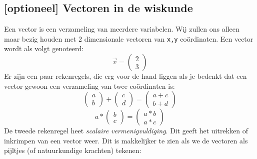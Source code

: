 \subsection{[optioneel] Vectoren in de wiskunde}
Een vector is een verzameling van meerdere variabelen. Wij zullen ons alleen maar bezig houden met 2 dimensionale vectoren van \texttt{x,y} co\"ordinaten.
Een vector wordt als volgt genoteerd: 
$$
\vec{v}=
\begin{pmatrix}
2\\ 
3
\end{pmatrix}
$$
Er zijn een paar rekenregels, die erg voor de hand liggen als je bedenkt dat een vector gewoon een verzameling van twee co\"ordinaten is:
$$
\begin{pmatrix}
a\\ 
b
\end{pmatrix}
+
\begin{pmatrix}
c\\ 
d
\end{pmatrix}
=
\begin{pmatrix}
a + c\\ 
b + d
\end{pmatrix}
$$
$$
a * 
\begin{pmatrix}
b\\ 
c
\end{pmatrix}
=
\begin{pmatrix}
a*b\\ 
a*c
\end{pmatrix}
$$
De tweede rekenregel heet \textit{scalaire vermenigvuldiging}. Dit geeft het uitrekken of inkrimpen van een vector weer. Dit is makkelijker te zien als we de vectoren als pijltjes (of natuurkundige krachten) tekenen:\\
